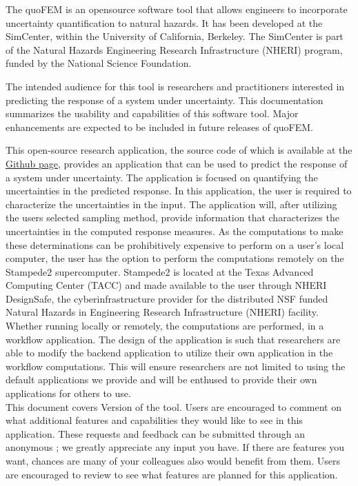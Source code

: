 The quoFEM is an opensource software tool that allows engineers to incorporate uncertainty quantification to natural hazards. It has been developed at the SimCenter, within the University of California, Berkeley. The SimCenter is part of the Natural Hazards Engineering Research Infrastructure (NHERI) program, funded by the National Science Foundation. 

The intended audience for this tool is researchers and practitioners interested in predicting the response of a system under uncertainty. This documentation summarizes the usability and capabilities of this software tool.  Major enhancements are expected to be included in future releases of quoFEM.

This open-source research application, the source code of which is
available at
the \href{https://github.com/NHERI-SimCenter/EE-UQ}{\texttt{\getsoftwarename{}}
Github page}, provides an application that can be used to predict the
response of a system under uncertainty. The application
is focused on quantifying the uncertainties in the predicted response.
 In this application, the user is required to
characterize the uncertainties in the input. The application will,
after utilizing the users selected sampling method, provide
information that characterizes the uncertainties in the computed
response measures. As the computations to make these determinations
can be prohibitively expensive to perform on a user's local computer,
the user has the option to perform the computations remotely on the
Stampede2 supercomputer. Stampede2 is located at the Texas Advanced
Computing Center (TACC) and made available to the user through NHERI
DesignSafe, the cyberinfrastructure provider for the distributed NSF
funded Natural Hazards in Engineering Research Infrastructure (NHERI)
facility.\\

Whether running locally or remotely, the computations are performed, in a workflow
application. The design of the \texttt{\getsoftwarename{}} application is such that researchers are able to modify the backend application to utilize their own application in the workflow
computations. This will ensure researchers are not limited to using
the default applications we provide and will be enthused to provide
their own applications for others to use. \\

This document covers Version \getsoftwareversion{} of the tool. Users are
encouraged to comment on what additional features and capabilities
they would like to see in this application. These requests and
feedback can be submitted through an anonymous ; we greatly appreciate any input you have. If there are
features you want, chances are many of your colleagues also would
benefit from them. Users are encouraged to review
 to see what features are planned for this
application.
